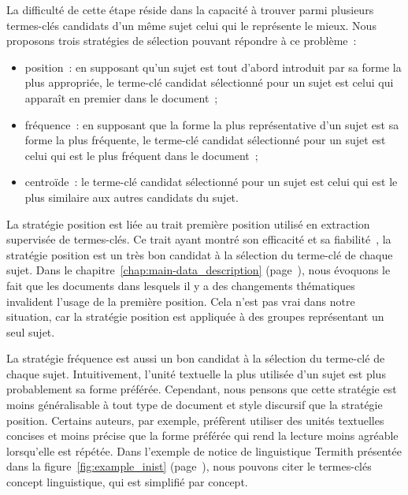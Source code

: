         La difficulté de cette étape réside dans la capacité à trouver parmi
        plusieurs termes-clés candidats d'un même sujet celui qui le représente
        le mieux. Nous proposons trois stratégies de sélection pouvant répondre
        à ce problème~:
        \begin{itemize}
          \item{position~: en supposant qu'un sujet est tout d'abord
                introduit par sa forme la plus appropriée, le terme-clé
                candidat sélectionné pour un sujet est celui qui apparaît en
                premier dans le document~;}
          \item{fréquence~: en supposant que la forme la plus représentative
                d'un sujet est sa forme la plus fréquente, le terme-clé candidat
                sélectionné pour un sujet est celui qui est le plus fréquent
                dans le document~;}
          \item{centroïde~: le terme-clé candidat sélectionné pour un sujet
                est celui qui est le plus similaire aux autres candidats du
                sujet.}
        \end{itemize}

        La stratégie position est liée au trait \og{}première position\fg{}
        utilisé en extraction supervisée de termes-clés. Ce trait ayant montré
        son efficacité et sa
        fiabilité~\cite{lim2012examiningthevalueofattributescores}, la stratégie
        position est un très bon candidat à la sélection du terme-clé de
        chaque sujet. Dans le chapitre~\ref{chap:main-data_description}
        (page~\pageref{chap:main-data_description}), nous évoquons le fait que
        les documents dans lesquels il y a des changements thématiques
        invalident l'usage de la première position. Cela n'est pas vrai dans
        notre situation, car la stratégie position est appliquée à des groupes
        représentant un seul sujet.

        La stratégie fréquence est aussi un bon candidat à la sélection du
        terme-clé de chaque sujet. Intuitivement, l'unité textuelle la plus
        utilisée d'un sujet est plus probablement sa forme préférée. Cependant,
        nous pensons que cette stratégie est moins généralisable à tout type de
        document et style discursif que la stratégie position. Certains
        auteurs, par exemple, préfèrent utiliser des unités textuelles concises
        et moins précise que la forme préférée qui rend la lecture moins
        agréable lorsqu'elle est répétée. Dans l'exemple de notice de
        linguistique Termith présentée dans la figure~\ref{fig:example_inist}
        (page~\pageref{fig:example_inist}), nous pouvons citer le termes-clés
        \og{}concept linguistique\fg{}, qui est simplifié par \og{}concept\fg{}.

